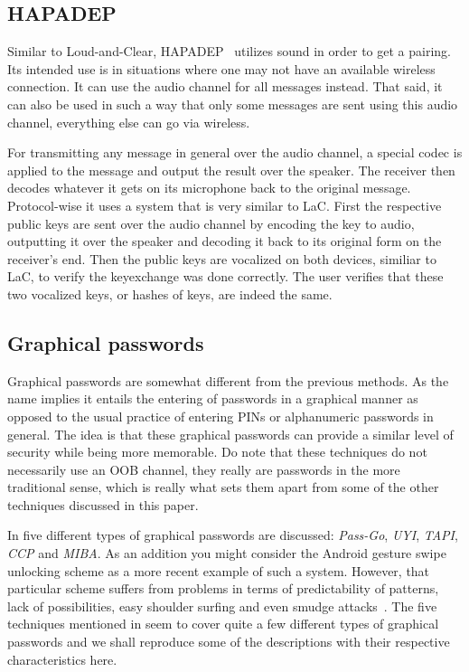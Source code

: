 \documentclass[conference, 11pt]{sty/IEEEtran}
\begin{document}
\subsection{HAPADEP}
\label{ssec:hapadep}

Similar to Loud-and-Clear, HAPADEP~\cite{soriente2008hapadep} utilizes sound in order to get a pairing.
Its intended use is in situations where one may not have an available wireless connection.
It can use the audio channel for all messages instead.
That said, it can also be used in such a way that only some messages are sent using this audio channel, everything else can go via wireless.

For transmitting any message in general over the audio channel, a special codec is applied to the message and output the result over the speaker.
The receiver then decodes whatever it gets on its microphone back to the original message.
Protocol-wise it uses a system that is very similar to LaC.
First the respective public keys are sent over the audio channel by encoding the key to audio, outputting it over the speaker and decoding it back to its original form on the receiver's end.
Then the public keys are vocalized on both devices, similiar to LaC, to verify the keyexchange was done correctly.
The user verifies that these two vocalized keys, or hashes of keys, are indeed the same.

\subsection{Graphical passwords}
\label{ssec:graphical_passwords}

Graphical passwords are somewhat different from the previous methods.
As the name implies it entails the entering of passwords in a graphical manner as opposed to the usual practice of entering PINs or alphanumeric passwords in general.
The idea is that these graphical passwords can provide a similar level of security while being more memorable.
Do note that these techniques do not necessarily use an OOB channel, they really are passwords in the more traditional sense, which is really what sets them apart from some of the other techniques discussed in this paper.

In \cite{schaub2013exploring} five different types of graphical passwords are discussed: \emph{Pass-Go}, \emph{UYI}, \emph{TAPI}, \emph{CCP} and \emph{MIBA}.
As an addition you might consider the Android gesture swipe unlocking scheme as a more recent example of such a system.
However, that particular scheme suffers from problems in terms of predictability of patterns, lack of possibilities, easy shoulder surfing and even smudge attacks~\cite{aviv2010smudge}.
The five techniques mentioned in \cite{schaub2013exploring} seem to cover quite a few different types of graphical passwords and we shall reproduce some of the descriptions with their respective characteristics here.
\end{document}
